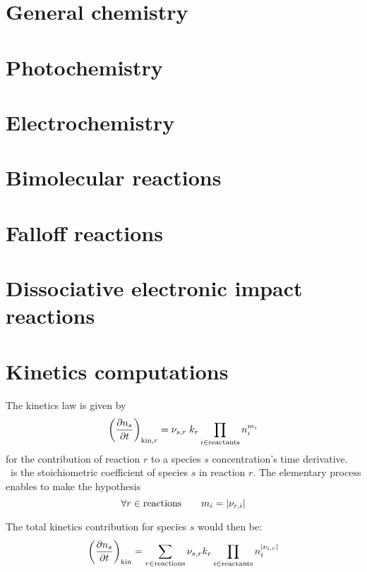 \hfil%

\section{General chemistry}


\section[Titan_code_photochem]{Photochemistry}


\section{Electrochemistry}


\section{Bimolecular reactions}
\label{Titan_bimol_sec}


\section{Falloff reactions}


\section{Dissociative electronic impact reactions}


\section{Kinetics computations}
The kinetics law is given by
\begin{equation}
\left(\frac{\partial n_s}{\partial t}\right)_{\text{kin},r} = {\nu_{s,r}}\; k_{r} \prod_{i\in\text{reactants}}n_i^{{m_{i}}}
\end{equation}
for the contribution of reaction $r$ to a species $s$ concentration's
time derivative. \ is the stoichiometric coefficient of species
$s$ in reaction $r$. The elementary process enables to make the hypothesis
\begin{equation}
\forall r \in \text{reactions}\qquad
{m_{i}} = |{\nu_{r,i}}|
\end{equation}

The total kinetics contribution for species $s$ would then be:
\begin{equation}
\left(\frac{\partial n_s}{\partial t}\right)_\text{kin} = \sum_{r\in \text{reactions}} {\nu_{s,r}} k_{r} \prod_{i\in\text{reactants}}n_i^{|{\nu_{i,r}}|}
\label{Titan:kinetics}
\end{equation}
